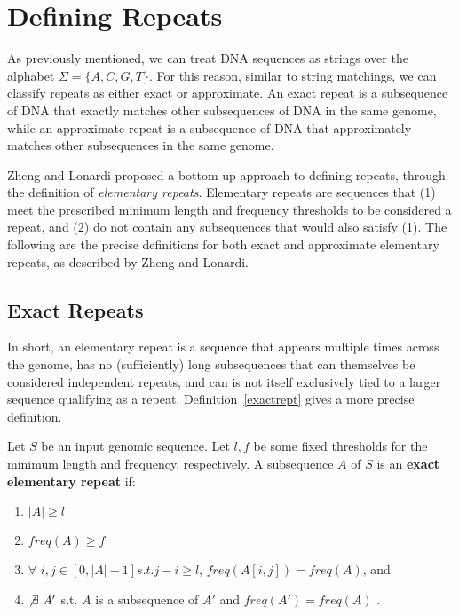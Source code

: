 \section{Defining Repeats}
As previously mentioned, we can treat DNA sequences as strings over the alphabet $\Sigma=\lbrace A, C, G, T \rbrace$. For this reason, similar to string matchings, we can classify repeats as either exact or approximate. An exact repeat is a subsequence of DNA that exactly matches other subsequences of DNA in the same genome, while an approximate repeat is a subsequence of DNA that approximately matches other subsequences in the same genome.

Zheng and Lonardi \cite{zheng2005discovery} proposed a bottom-up approach to defining repeats, through the definition of \textit{elementary repeats}. Elementary repeats are sequences that (1) meet the prescribed minimum length and frequency thresholds to be considered a repeat, and (2) do not contain any subsequences that would also satisfy (1). The following are the precise definitions for both exact and approximate elementary repeats, as described by Zheng and Lonardi.

\subsection{Exact Repeats}
In short, an elementary repeat is a sequence that appears multiple times across the genome, has no (sufficiently) long subsequences that can themselves be considered independent repeats, and can is not itself exclusively tied to a larger sequence qualifying as a repeat. Definition~\ref{exactrept} gives a more precise definition.

\begin{defn}
Let $S$ be an input genomic sequence. Let $l, f$ be some fixed thresholds for the minimum length and frequency, respectively.  A subsequence $A$ of $S$ is an \textbf{exact elementary repeat} if:
\begin{enumerate}
\item{$|A| \geq l$}
\item{$freq(A) \geq f$}
\item{$\forall$ $i, j \in [0,|A|-1] s.t. j-i \geq l$,  $freq(A[i,j]) = freq(A)$, and}
\item{$\not\exists\ A'$ s.t. $A$ is a subsequence of $A'$ and $freq(A') = freq(A)$ \cite{zheng2005discovery}.}
\end{enumerate}
\label{exactrept}
\end{defn}

